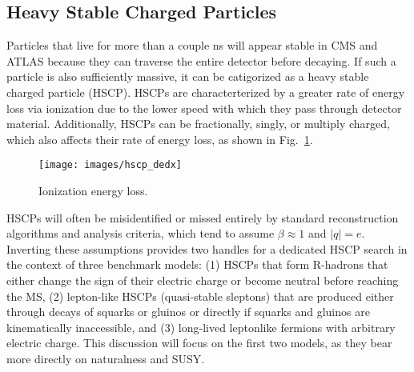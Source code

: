 \documentclass[12pt]{article}
\begin{document}
    \subsection{Heavy Stable Charged Particles}
        Particles that live for more than a couple ns  will appear stable in CMS and ATLAS because they can traverse the entire detector before decaying. If such a particle is also sufficiently massive, it can be catigorized as a heavy stable charged particle (HSCP). HSCPs are characterterized by a greater rate of energy loss via ionization due to the lower speed with which they pass through detector material. Additionally, HSCPs can be fractionally, singly, or multiply charged, which also affects their rate of energy loss, as shown in Fig.~\ref{hscp_dedx}.

        \noindent \begin{figure}[htbp] \begin{center}
        \texttt{[image: images/hscp\_dedx]}
            \caption{Ionization energy loss.}
        \label{hscp_dedx}
        \end{center} \end{figure}

        HSCPs will often be misidentified or missed entirely by standard reconstruction algorithms and analysis criteria, which tend to assume $\beta \approx \num{1}$ and $\lvert q \rvert = e$. Inverting these assumptions provides two handles for a dedicated HSCP search in the context of three benchmark models: (1) HSCPs that form R-hadrons that either change the sign of their electric charge or become neutral before reaching the MS, (2) lepton-like HSCPs (quasi-stable sleptons) that are produced either through decays of squarks or gluinos or directly if squarks and gluinos are kinematically inaccessible, and (3) long-lived leptonlike fermions with arbitrary electric charge. This discussion will focus on the first two models, as they bear more directly on naturalness and SUSY.

         
\end{document}
